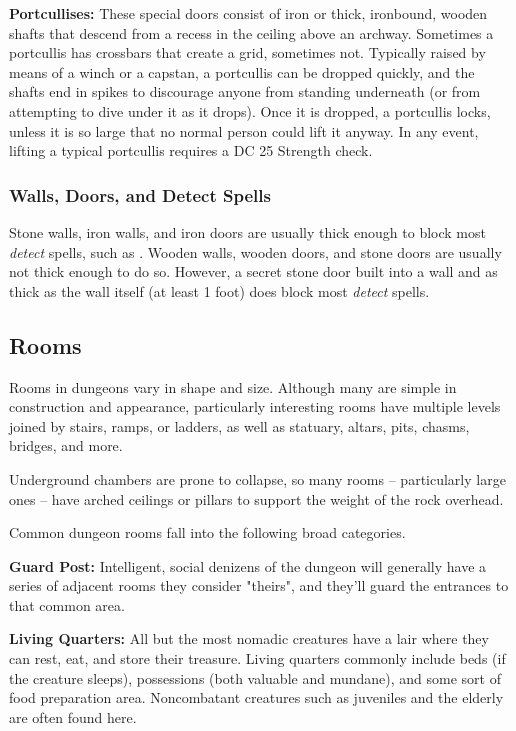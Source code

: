 \textbf{Portcullises:} These special doors consist of iron or thick, ironbound, 
wooden shafts that descend from a recess in the ceiling above an archway. Sometimes 
a portcullis has crossbars that create a grid, sometimes not. Typically raised 
by means of a winch or a capstan, a portcullis can be dropped quickly, and the 
shafts end in spikes to discourage anyone from standing underneath (or from attempting 
to dive under it as it drops). Once it is dropped, a portcullis locks, unless it 
is so large that no normal person could lift it anyway. In any event, lifting a 
typical portcullis requires a DC 25 Strength check.

\subsubsection{Walls, Doors, and Detect Spells}

Stone walls, iron walls, and iron doors are usually thick enough to block most 
\textit{detect} spells, such as . Wooden walls, wooden 
doors, and stone doors are usually not thick enough to do so. However, a secret 
stone door built into a wall and as thick as the wall itself (at least 1 foot) 
does block most \textit{detect} spells.

\subsection{Rooms}

Rooms in dungeons vary in shape and size. Although many are simple in construction 
and appearance, particularly interesting rooms have multiple levels joined by stairs, 
ramps, or ladders, as well as statuary, altars, pits, chasms, bridges, and more.

Underground chambers are prone to collapse, so many rooms -- particularly large 
ones -- have arched ceilings or pillars to support the weight of the rock overhead.

Common dungeon rooms fall into the following broad categories. 

\textbf{Guard Post:} Intelligent, social denizens of the dungeon will generally 
have a series of adjacent rooms they consider "theirs", and they'll guard the 
entrances to that common area. 

\textbf{Living Quarters:} All but the most nomadic creatures have a lair where 
they can rest, eat, and store their treasure. Living quarters commonly include 
beds (if the creature sleeps), possessions (both valuable and mundane), and some 
sort of food preparation area. Noncombatant creatures such as juveniles and the 
elderly are often found here.

